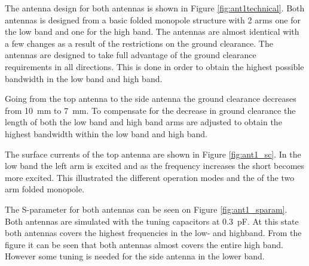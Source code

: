 The antenna design for both antennas is shown in Figure \ref{fig:ant1technical}. Both antennas is designed from a basic folded monopole structure with 2 arms one for the low band and one for the high band. The antennas are almost identical with a few changes as a result of the restrictions on the ground clearance.
The antennas are designed to take full advantage of the ground clearance requirements in all directions. This is done in order to obtain the highest possible bandwidth in the low band and high band. 

Going from the top antenna to the side antenna the ground clearance decreases from \SI{10}{mm} to \SI{7}{mm}. To compensate for the decrease in ground clearance the length of both the low band and high band arms are adjusted to obtain the highest bandwidth within the low band and high band. 

The surface currents of the top antenna are shown in Figure \ref{fig:ant1_sc}. In the low band the left arm is excited and as the frequency increases the short becomes more excited. This illustrated the different operation modes and the of the two arm folded monopole.

The S-parameter for both antennas can be seen on Figure \ref{fig:ant1_sparam}. Both antennas are simulated with the tuning capacitors at \SI{0.3}{pF}. At this state both antennas covers the highest frequencies in the low- and highband. From the figure it can be seen that both antennas almost covers the entire high band. However some tuning is needed for the side antenna in the lower band.   

